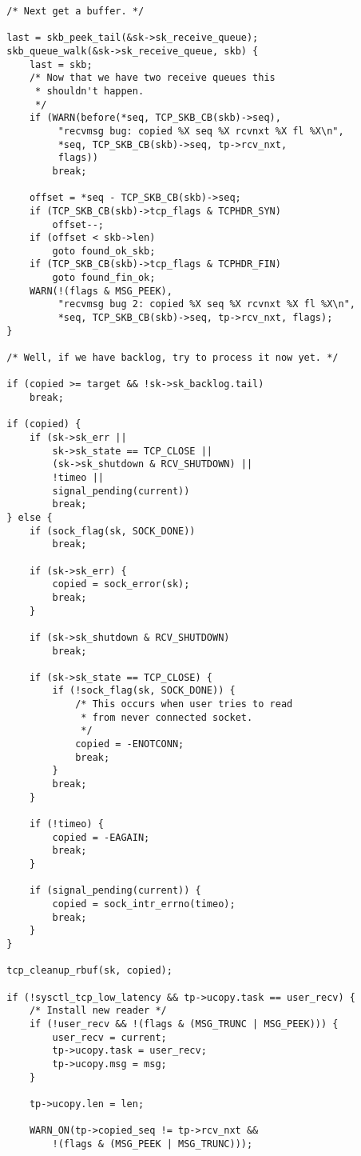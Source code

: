 \begin{verbatim}
		/* Next get a buffer. */

		last = skb_peek_tail(&sk->sk_receive_queue);
		skb_queue_walk(&sk->sk_receive_queue, skb) {
			last = skb;
			/* Now that we have two receive queues this
			 * shouldn't happen.
			 */
			if (WARN(before(*seq, TCP_SKB_CB(skb)->seq),
				 "recvmsg bug: copied %X seq %X rcvnxt %X fl %X\n",
				 *seq, TCP_SKB_CB(skb)->seq, tp->rcv_nxt,
				 flags))
				break;

			offset = *seq - TCP_SKB_CB(skb)->seq;
			if (TCP_SKB_CB(skb)->tcp_flags & TCPHDR_SYN)
				offset--;
			if (offset < skb->len)
				goto found_ok_skb;
			if (TCP_SKB_CB(skb)->tcp_flags & TCPHDR_FIN)
				goto found_fin_ok;
			WARN(!(flags & MSG_PEEK),
			     "recvmsg bug 2: copied %X seq %X rcvnxt %X fl %X\n",
			     *seq, TCP_SKB_CB(skb)->seq, tp->rcv_nxt, flags);
		}

		/* Well, if we have backlog, try to process it now yet. */

		if (copied >= target && !sk->sk_backlog.tail)
			break;

		if (copied) {
			if (sk->sk_err ||
			    sk->sk_state == TCP_CLOSE ||
			    (sk->sk_shutdown & RCV_SHUTDOWN) ||
			    !timeo ||
			    signal_pending(current))
				break;
		} else {
			if (sock_flag(sk, SOCK_DONE))
				break;

			if (sk->sk_err) {
				copied = sock_error(sk);
				break;
			}

			if (sk->sk_shutdown & RCV_SHUTDOWN)
				break;

			if (sk->sk_state == TCP_CLOSE) {
				if (!sock_flag(sk, SOCK_DONE)) {
					/* This occurs when user tries to read
					 * from never connected socket.
					 */
					copied = -ENOTCONN;
					break;
				}
				break;
			}

			if (!timeo) {
				copied = -EAGAIN;
				break;
			}

			if (signal_pending(current)) {
				copied = sock_intr_errno(timeo);
				break;
			}
		}

		tcp_cleanup_rbuf(sk, copied);

		if (!sysctl_tcp_low_latency && tp->ucopy.task == user_recv) {
			/* Install new reader */
			if (!user_recv && !(flags & (MSG_TRUNC | MSG_PEEK))) {
				user_recv = current;
				tp->ucopy.task = user_recv;
				tp->ucopy.msg = msg;
			}

			tp->ucopy.len = len;

			WARN_ON(tp->copied_seq != tp->rcv_nxt &&
				!(flags & (MSG_PEEK | MSG_TRUNC)));


\end{verbatim}
